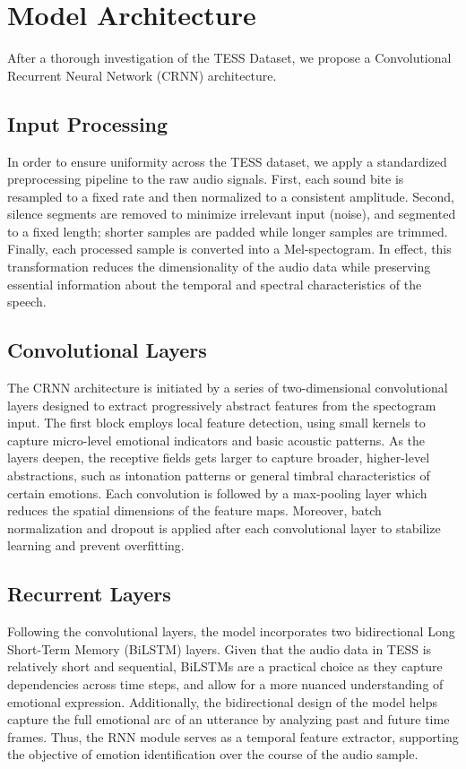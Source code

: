 \documentclass[../main.tex]{subfiles}
\begin{document}
\section{Model Architecture}
After a thorough investigation of the TESS Dataset, we propose a Convolutional 
Recurrent Neural Network (CRNN) architecture.

\subsection{Input Processing}
In order to ensure uniformity across the TESS dataset, we apply a standardized 
preprocessing pipeline to the raw audio signals. First, each sound bite is 
resampled to a fixed rate and then normalized to a consistent amplitude. Second, 
silence segments are removed to minimize irrelevant input (noise), and segmented 
to a fixed length; shorter samples are padded while longer samples are trimmed. 
Finally, each processed sample is converted into a Mel-spectogram. In effect, 
this transformation reduces the dimensionality of the audio data while 
preserving essential information about the temporal and spectral characteristics 
of the speech.

\subsection{Convolutional Layers}
The CRNN architecture is initiated by a series of two-dimensional convolutional 
layers designed to extract progressively abstract features from the spectogram 
input. The first block employs local feature detection, using small kernels to 
capture micro-level emotional indicators and basic acoustic patterns. As the 
layers deepen, the receptive fields gets larger to capture broader, higher-level 
abstractions, such as intonation patterns or general timbral characteristics of 
certain emotions. Each convolution is followed by a max-pooling layer which 
reduces the spatial dimensions of the feature maps. Moreover, batch 
normalization and dropout is applied after each convolutional layer to stabilize 
learning and prevent overfitting.

\subsection{Recurrent Layers}
Following the convolutional layers, the model incorporates two bidirectional 
Long Short-Term Memory (BiLSTM) layers. Given that the audio data in TESS is 
relatively short and sequential, BiLSTMs are a practical choice as they capture 
dependencies across time steps, and allow for a more nuanced understanding of 
emotional expression. Additionally, the bidirectional design of the model helps 
capture the full emotional arc of an utterance by analyzing past and future time 
frames. Thus, the RNN module serves as a temporal feature extractor, supporting 
the objective of emotion identification over the course of the audio sample.
\end{document}
